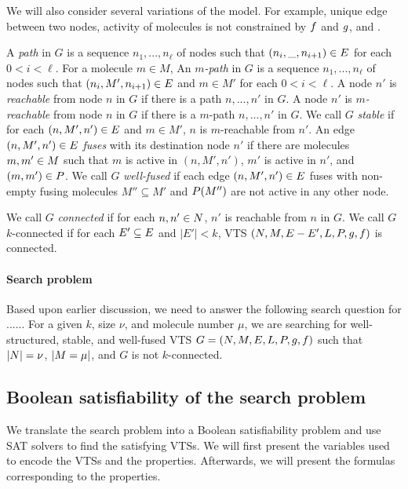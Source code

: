 We will also consider several variations of the model.
%
For example, unique edge between two nodes, activity of molecules is
not constrained by $f$ and $g$, and .
%

A {\em path} in $G$ is a sequence $n_1,...,n_\ell$ of nodes 
such that $(n_i,\_,n_{i+1}) \in E$ for each $ 0 < i < \ell$.
%
For a molecule $m \in M$,
An {\em $m$-path} in $G$ is a sequence $n_1,...,n_\ell$ of nodes 
such that $(n_i,M',n_{i+1}) \in E$ and $m \in M'$ for
each $ 0 < i < \ell$.
%
A node $n'$ is {\em reachable} from node $n$ in $G$ if there is a path
$n,...,n'$ in $G$.
%
A node $n'$ is {\em $m$-reachable} from node $n$ in $G$ if there is a
$m$-path $n,...,n'$ in $G$.
%
We call $G$ {\em stable} if for each $(n,M',n') \in E$ and $m \in M'$,
$n$ is $m$-reachable from $n'$.
%
An edge $(n,M',n') \in E$ {\em fuses} with its destination node $n'$
if there are molecules $m,m' \in M$ such that $m$ is active in
$(n,M',n')$, $m'$ is active in $n'$, and $(m,m') \in P$.
%
We call $G$ {\em well-fused} if each edge $(n,M',n') \in E$ fuses
with non-empty fusing molecules $M'' \subseteq M'$
and $P(M'')$ are not active in any other node.



%
We call $G$ {\em connected} if for each $n,n' \in N$,
$n'$ is reachable from $n$ in $G$.
%
We call $G$ $k$-connected if for each $E' \subseteq E$ and $|E'| < k$,
VTS $(N,M,E-E',L,P,g,f)$ is connected.


\paragraph{Search problem}

Based upon earlier discussion, we need to answer the following search
question for ......
For a given $k$, size $\nu$, and molecule number $\mu$,
we are searching for well-structured, stable, and well-fused VTS
$G = (N,M,E,L,P,g,f)$ such that
$|N| = \nu$, $|M = \mu|$, and
$G$ is not $k$-connected.    


\subsection{Boolean satisfiability of the search problem}

We translate the search problem into a Boolean satisfiability
problem and use SAT solvers to find the satisfying VTSs.
%
We will first present the variables used to encode the
VTSs and the properties.
%
Afterwards, we will present the formulas corresponding to the
properties.

